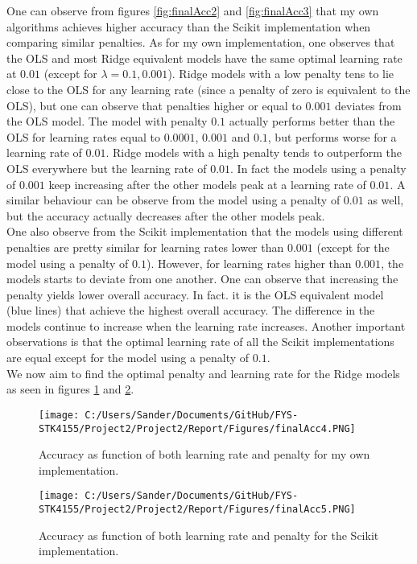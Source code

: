 \documentclass[12pt,a4paper]{article}
\begin{document}
\noindent One can observe from figures \ref{fig:finalAcc2} and \ref{fig:finalAcc3} that my own algorithms achieves higher accuracy than the Scikit implementation when comparing similar penalties. As for my own implementation, one observes that the OLS and most Ridge equivalent models have the same optimal learning rate at $0.01$ (except for $\lambda = 0.1, 0.001$). Ridge models with a low penalty tens to lie close to the OLS for any learning rate (since a penalty of zero is equivalent to the OLS), but one can observe that penalties higher or equal to $0.001$ deviates from the OLS model. The model with penalty $0.1$ actually performs better than the OLS for learning rates equal to $0.0001$, $0.001$ and $0.1$, but performs worse for a learning rate of $0.01$. Ridge models with a high penalty tends to outperform the OLS everywhere but the learning rate of $0.01$. In fact the models using a penalty of $0.001$ keep increasing after the other models peak at a learning rate of $0.01$. A similar behaviour can be observe from the model using a penalty of $0.01$ as well, but the accuracy actually decreases after the other models peak.
\\
One also observe from the Scikit implementation that the models using different penalties are pretty similar for learning rates lower than $0.001$ (except for the model using a penalty of $0.1$). However, for learning rates higher than $0.001$, the models starts to deviate from one another. One can observe that increasing the penalty yields lower overall accuracy. In fact. it is the OLS equivalent model (blue lines) that achieve the highest overall accuracy. The difference in the models continue to increase when the learning rate increases. Another important observations is that the optimal learning rate of all the Scikit implementations are equal except for the model using a penalty of $0.1$.
\\
We now aim to find the optimal penalty and learning rate for the Ridge models as seen in figures \ref{fig:finalAcc4} and \ref{fig:finalAcc5}.

\begin{figure}[H]
\centering
\texttt{[image: C:/Users/Sander/Documents/GitHub/FYS-STK4155/Project2/Project2/Report/Figures/finalAcc4.PNG]}
\caption{\label{fig:finalAcc4} Accuracy as function of both learning rate and penalty for my own implementation.}
\end{figure}

\begin{figure}[H]
\centering
\texttt{[image: C:/Users/Sander/Documents/GitHub/FYS-STK4155/Project2/Project2/Report/Figures/finalAcc5.PNG]}
\caption{\label{fig:finalAcc5} Accuracy as function of both learning rate and penalty for the Scikit implementation.}
\end{figure}
\end{document}
